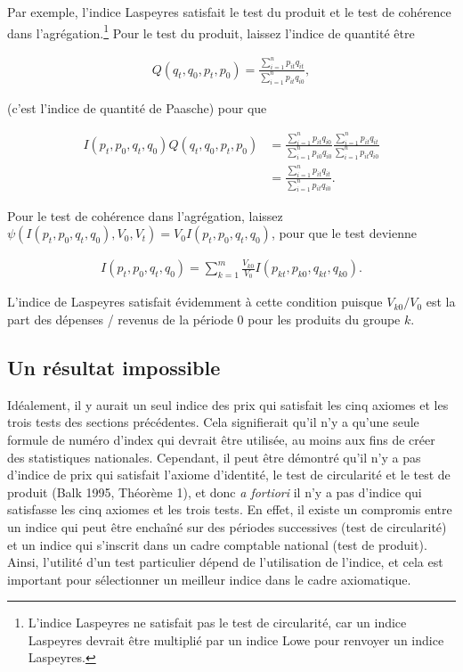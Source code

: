 \documentclass[]{article}
\begin{document}
Par exemple, l'indice Laspeyres satisfait le test du produit et le test de cohérence dans l'agrégation.\footnote{L'indice Laspeyres ne satisfait pas le test de circularité, car un indice Laspeyres devrait être multiplié par un indice Lowe pour renvoyer un indice Laspeyres.} Pour le test du produit, laissez l'indice de quantité être

\begin{align*}
Q (q_{t}, q_{0}, p_{t}, p_{0}) = \frac{\sum_{i = 1}^{n} p_{it} q_{it}}{\sum_{i = 1}^{n} p_{it} q_{i0}},
\end{align*}

(c'est l'indice de quantité de Paasche) pour que

\begin{align*}
I(p_{t}, p_{0}, q_{t}, q_{0}) Q (q_{t}, q_{0}, p_{t}, p_{0}) &= \frac{\sum_{i = 1}^{n} p_{it} q_{i0}}{\sum_{i = 1}^{n} p_{i0} q_{i0}} \frac{\sum_{i = 1}^{n} p_{it} q_{it}}{\sum_{i = 1}^{n} p_{it} q_{i0}} \\
&= \frac{\sum_{i = 1}^{n} p_{it} q_{it}}{\sum_{i = 1}^{n} p_{it} q_{i0}}.
\end{align*}

Pour le test de cohérence dans l'agrégation, laissez \(\psi (I(p_{t}, p_{0}, q_{t}, q_{0}), V_{0}, V_{t}) = V_0 I(p_{t}, p_{0}, q_{t}, q_{0})\), pour que le test devienne

\begin{align*}
I(p_{t}, p_{0}, q_{t}, q_{0}) = \sum_{k = 1}^{m} \frac{V_{k0}}{V_0} I(p_{kt }, p_{k0}, q_{kt}, q_{k0}).
\end{align*}

L'indice de Laspeyres satisfait évidemment à cette condition puisque \(V_{k0} / V_0\) est la part des dépenses / revenus de la période 0 pour les produits du groupe \(k\).

\hypertarget{un-ruxe9sultat-impossible}{%
\subsection{Un résultat impossible}\label{un-ruxe9sultat-impossible}}

Idéalement, il y aurait un seul indice des prix qui satisfait les cinq axiomes et les trois tests des sections précédentes. Cela signifierait qu'il n'y a qu'une seule formule de numéro d'index qui devrait être utilisée, au moins aux fins de créer des statistiques nationales. Cependant, il peut être démontré qu'il n'y a pas d'indice de prix qui satisfait l'axiome d'identité, le test de circularité et le test de produit (Balk 1995, Théorème 1), et donc \emph{a fortiori} il n'y a pas d'indice qui satisfasse les cinq axiomes et les trois tests. En effet, il existe un compromis entre un indice qui peut être enchaîné sur des périodes successives (test de circularité) et un indice qui s'inscrit dans un cadre comptable national (test de produit). Ainsi, l'utilité d'un test particulier dépend de l'utilisation de l'indice, et cela est important pour sélectionner un meilleur indice dans le cadre axiomatique.
\end{document}
